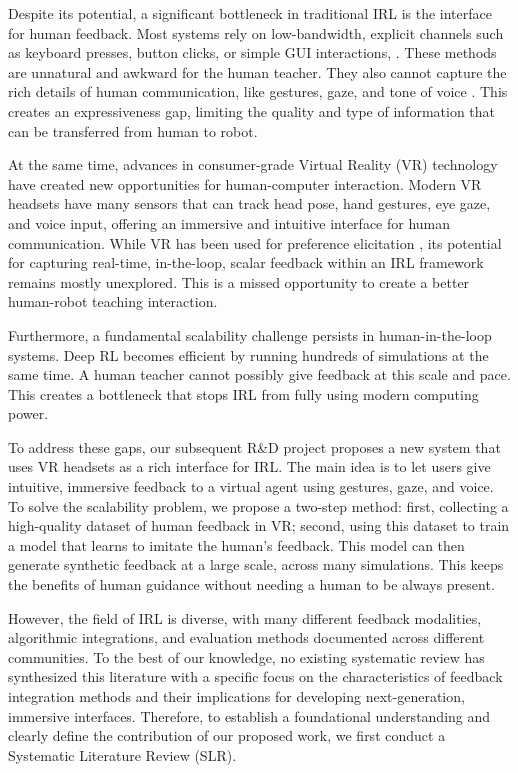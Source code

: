 \documentclass[rnd]{mas_proposal}
\begin{document}
Despite its potential, a significant bottleneck in traditional IRL is the interface for human feedback. Most systems rely on low-bandwidth, explicit channels such as keyboard presses, button clicks, or simple GUI interactions, \citep{Faulkner2020, Loftin2014}. These methods are unnatural and awkward for the human teacher. They also cannot capture the rich details of human communication, like gestures, gaze, and tone of voice \citep{9794595, Lin2020a}. This creates an expressiveness gap, limiting the quality and type of information that can be transferred from human to robot.

At the same time, advances in consumer-grade Virtual Reality (VR) technology have created new opportunities for human-computer interaction. Modern VR headsets have many sensors that can track head pose, hand gestures, eye gaze, and voice input, offering an immersive and intuitive interface for human communication. While VR has been used for preference elicitation \cite{Heuvel2025}, its potential for capturing real-time, in-the-loop, scalar feedback within an IRL framework remains mostly unexplored. This is a missed opportunity to create a better human-robot teaching interaction.

Furthermore, a fundamental scalability challenge persists in human-in-the-loop systems. Deep RL becomes efficient by running hundreds of simulations at the same time. A human teacher cannot possibly give feedback at this scale and pace. This creates a bottleneck that stops IRL from fully using modern computing power.

To address these gaps, our subsequent R\&D project proposes a new system that uses VR headsets as a rich interface for IRL. The main idea is to let users give intuitive, immersive feedback to a virtual agent using gestures, gaze, and voice. To solve the scalability problem, we propose a two-step method: first, collecting a high-quality dataset of human feedback in VR; second, using this dataset to train a model that learns to imitate the human's feedback. This model can then generate synthetic feedback at a large scale, across many simulations. This keeps the benefits of human guidance without needing a human to be always present.

However, the field of IRL is diverse, with many different feedback modalities, algorithmic integrations, and evaluation methods documented across different communities. To the best of our knowledge, no existing systematic review has synthesized this literature with a specific focus on the characteristics of feedback integration methods and their implications for developing next-generation, immersive interfaces. Therefore, to establish a foundational understanding and clearly define the contribution of our proposed work, we first conduct a Systematic Literature Review (SLR).
\end{document}
